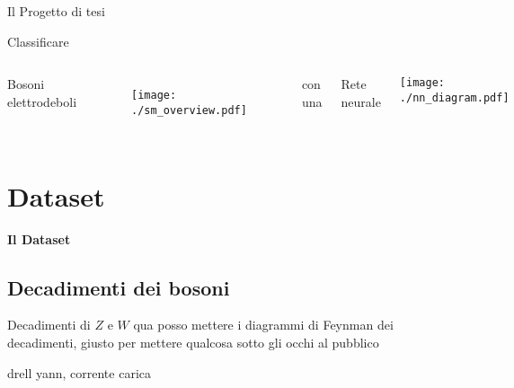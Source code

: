 \documentclass{beamer}
\begin{document}
\begin{frame}{Il Progetto di tesi}
%
%
  \vspace*{-3.5ex}
  \begin{center}
    \Large
    Classificare
  \end{center}
  \vspace*{-1.5ex}
  \begin{columns}[T]
      \begin{block}{}
        \centering%
        Bosoni elettrodeboli
      \end{block}
      \begin{figure}
        \centering
        \texttt{[image: ./sm\_overview.pdf]}
      \end{figure}

      {
        \begin{block}{}
          \centering\small
          con una
        \end{block}
      }
      \begin{block}{}
        \centering
        Rete neurale
      \end{block}
      \parbox[t][][c]{\textwidth}{
        \vspace*{3ex}
        \centering
        \texttt{[image: ./nn\_diagram.pdf]}
      }
  \end{columns}
\end{frame}

\section{Dataset}
\begin{frame}
  \centering
  \Huge\bfseries
  Il Dataset
\end{frame}

\subsection{Decadimenti dei bosoni}
\begin{frame}{Decadimenti di $Z$ e $W$}
  qua posso mettere i diagrammi di Feynman dei decadimenti, giusto per mettere qualcosa sotto gli occhi al pubblico

  drell yann, corrente carica
\end{frame}
\end{document}
